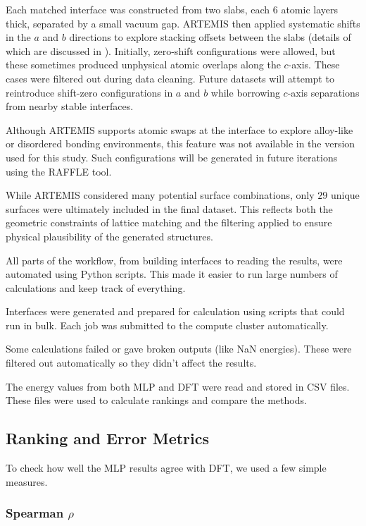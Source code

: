 Each matched interface was constructed from two slabs, each $6$ atomic layers thick, separated by a small vacuum gap.
ARTEMIS then applied systematic shifts in the $a$ and $b$ directions to explore stacking offsets between the slabs (details of which are discussed in ).
Initially, zero-shift configurations were allowed, but these sometimes produced unphysical atomic overlaps along the $c$-axis.
These cases were filtered out during data cleaning.
Future datasets will attempt to reintroduce shift-zero configurations in $a$ and $b$ while borrowing $c$-axis separations from nearby stable interfaces.

Although ARTEMIS supports atomic swaps at the interface to explore alloy-like or disordered bonding environments\cite{artemis_paper}, this feature was not available in the version used for this study.
Such configurations will be generated in future iterations using the RAFFLE tool.

\newpage While ARTEMIS considered many potential surface combinations, only $29$ unique surfaces were ultimately included in the final dataset.
This reflects both the geometric constraints of lattice matching and the filtering applied to ensure physical plausibility of the generated structures.

All parts of the workflow, from building interfaces to reading the results, were automated using Python scripts.
This made it easier to run large numbers of calculations and keep track of everything.

Interfaces were generated and prepared for calculation using scripts that could run in bulk.
Each job was submitted to the compute cluster automatically.

Some calculations failed or gave broken outputs (like NaN energies).
These were filtered out automatically so they didn't affect the results.

The energy values from both MLP and DFT were read and stored in CSV files.
These files were used to calculate rankings and compare the methods.

\subsection{Ranking and Error Metrics}

To check how well the MLP results agree with DFT, we used a few simple measures.

\subsubsection*{Spearman $\rho$}

